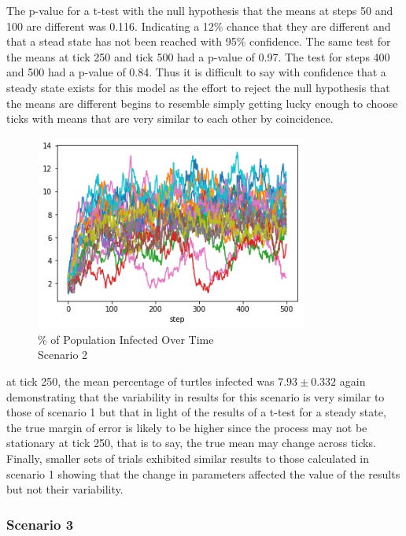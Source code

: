 \documentclass[11pt]{article} %
\begin{document}
The p-value for a t-test with the null hypothesis that the means at steps 50 and 100 are different was 0.116. Indicating a 12\% chance that they are different and that a stead state has not been reached with 95\% confidence. The same test for the means at tick 250 and tick 500 had a p-value of 0.97. The test for steps 400 and 500 had a p-value of 0.84. Thus it is difficult to say with confidence that a steady state exists for this model as the effort to reject the null hypothesis that the means are different begins to resemble simply getting lucky enough to choose ticks with means that are very similar to each other by coincidence. 

\begin{figure}
\centering
\includegraphics[width=0.8\textwidth]{20-runs-scenario-2-steady-state}
\caption{\% of Population Infected Over Time \\ Scenario 2}
\end{figure}



at tick 250, the mean percentage of turtles infected was $7.93 \pm 0.332$ again demonstrating that the variability in results for this scenario is very similar to those of scenario 1 but that in light of the results of a t-test for a steady state, the true margin of error is likely to be higher since the process may not be stationary at tick 250, that is to say, the true mean may change across ticks.  Finally, smaller sets of trials exhibited similar results to those calculated in scenario 1 showing that the change in parameters affected the value of the results but not their variability. 

\subsubsection{Scenario 3}
\end{document}
